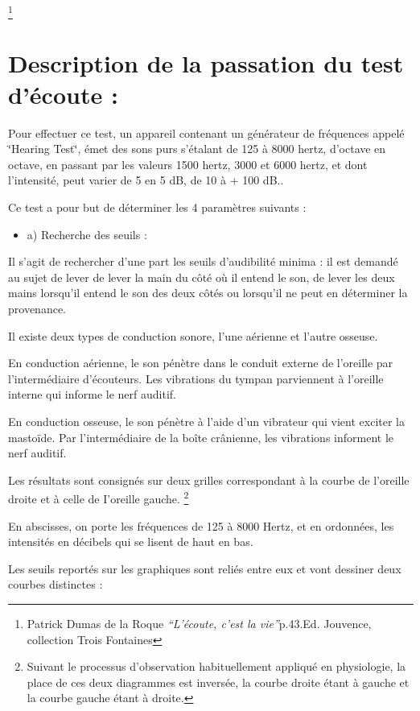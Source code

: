\footnote{Patrick Dumas de la Roque \emph{``L'écoute, c'est la vie''}p.43.Ed.
Jouvence, collection Trois Fontaines}

\section{Description de la passation du test d'écoute :}

Pour effectuer ce test, un appareil contenant un générateur de fréquences
appelé \char`\"{}Hearing Test\char`\"{}, émet des sons purs s'étalant
de 125 à 8000 hertz, d'octave en octave, en passant par les valeurs
1500 hertz, 3000 et 6000 hertz, et dont l'intensité, peut varier de
5 en 5 dB, de 10 à + 100 dB.. 

Ce test a pour but de déterminer les 4 paramètres suivants : 
\begin{itemize}
\item a) Recherche des seuils :
\end{itemize}
Il s'agit de rechercher d'une part les seuils d\textquoteright audibilité
minima : il est demandé au sujet de lever de lever la main du côté
où il entend le son, de lever les deux mains lorsqu'il entend le son
des deux côtés ou lorsqu'il ne peut en déterminer la provenance.

Il existe deux types de conduction sonore, l'une aérienne et l'autre
osseuse.

En conduction aérienne, le son pénètre dans le conduit externe de
l'oreille par l'intermédiaire d'écouteurs. Les vibrations du tympan
parviennent à l'oreille interne qui informe le nerf auditif.

En conduction osseuse, le son pénètre à l\textquoteright aide d'un
vibrateur qui vient exciter la mastoïde. Par l'intermédiaire de la
boîte crânienne, les vibrations informent le nerf auditif.

Les résultats sont consignés sur deux grilles correspondant à la courbe
de l'oreille droite et à celle de I\textquoteright oreille gauche.
\footnote{Suivant le processus d'observation habituellement appliqué en physiologie,
la place de ces deux diagrammes est inversée, la courbe droite étant
à gauche et la courbe gauche étant à droite. }

En abscisses, on porte les fréquences de 125 à 8000 Hertz, et en ordonnées,
les intensités en décibels qui se lisent de haut en bas. 

Les seuils reportés sur les graphiques sont reliés entre eux et vont
dessiner deux courbes distinctes : 

